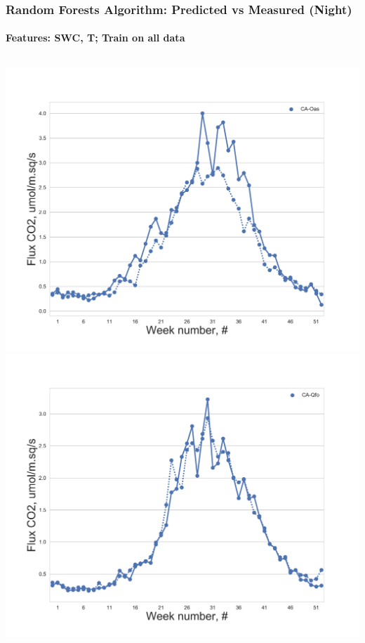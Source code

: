 \documentclass{beamer}
\begin{document}
\begin{frame}
\frametitle{Random Forests Algorithm: Predicted vs Measured (Night)}
\framesubtitle{Features: SWC, T; Train on all data}

\begin{columns}[t]
\centering
\includegraphics[width=\textwidth]{F_ML_train_all/10.png}\\
\includegraphics[width=\textwidth]{F_ML_train_all/14.png}
\centering

\end{columns}
\end{frame}
\end{document}
